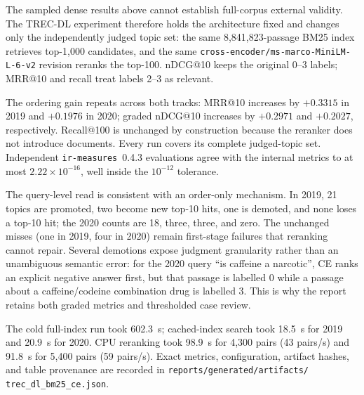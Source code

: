 \documentclass[11pt,a4paper]{article}
\makeatletter
\newcommand{\mrr}{MRR@10}
\newcommand{\ndcg}{nDCG@10}
\newcommand{\recallK}{Recall@1000}
\newcommand{\bmtwofive}{BM25}
\makeatother
\begin{document}
The sampled dense results above cannot establish full-corpus external
validity.  The TREC-DL experiment therefore holds the architecture
fixed and changes only the independently judged topic set: the same
8,841,823-passage \bmtwofive{} index retrieves top-1,000 candidates,
and the same \texttt{cross-encoder/ms-marco-MiniLM-L-6-v2} revision
reranks the top-100.  \ndcg{} keeps the original 0--3 labels; \mrr{}
and recall treat labels 2--3 as relevant.

\begin{table}[H]
  \centering
  \caption{Full-corpus \bmtwofive{} versus \bmtwofive{} plus
  cross-encoder reranking on all 43 judged TREC-DL 2019 passage
  topics.  The reranked run contains top-100 only, so its
  \recallK{} is not reported.}
  \label{tab:trec-dl-2019}
  
\end{table}

\begin{table}[H]
  \centering
  \caption{The same frozen full-corpus protocol on all 54 judged
  TREC-DL 2020 passage topics.}
  \label{tab:trec-dl-2020}
  
\end{table}

The ordering gain repeats across both tracks: \mrr{} increases by
$+0.3315$ in 2019 and $+0.1976$ in 2020; graded \ndcg{} increases by
$+0.2971$ and $+0.2027$, respectively.  Recall@100 is unchanged by
construction because the reranker does not introduce documents.
Every run covers its complete judged-topic set.  Independent
\texttt{ir-measures}~0.4.3 evaluations agree with the internal
metrics to at most $2.22\!\times\!10^{-16}$, well inside the
$10^{-12}$ tolerance.

The query-level read is consistent with an order-only mechanism.
In 2019, 21 topics are promoted, two become new top-10 hits, one is
demoted, and none loses a top-10 hit; the 2020 counts are 18, three,
three, and zero.  The unchanged misses (one in 2019, four in 2020)
remain first-stage failures that reranking cannot repair.  Several
demotions expose judgment granularity rather than an unambiguous
semantic error: for the 2020 query ``is caffeine a narcotic'', CE
ranks an explicit negative answer first, but that passage is labelled
0 while a passage about a caffeine/codeine combination drug is
labelled 3.  This is why the report retains both graded metrics and
thresholded case review.

The cold full-index run took 602.3~s; cached-index search took 18.5~s
for 2019 and 20.9~s for 2020.  CPU reranking took 98.9~s for 4,300
pairs (43 pairs/s) and 91.8~s for 5,400 pairs (59 pairs/s).  Exact
metrics, configuration, artifact hashes, and table provenance are
recorded in \texttt{reports/generated/artifacts/
trec\_dl\_bm25\_ce.json}.
\end{document}
